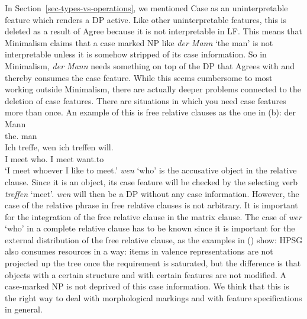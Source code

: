 \documentclass[output=paper,biblatex,babelshorthands,newtxmath,draftmode,colorlinks,citecolor=brown]{langscibook}
\begin{document}
In Section~\ref{sec-types-vs-operations}, we mentioned Case as an uninterpretable feature which
renders a DP active. Like other uninterpretable features, this is deleted as a result of Agree
because it is not interpretable in LF. 
This means that Minimalism claims
that a case marked NP like \emph{der Mann} `the man' is not interpretable unless it is somehow
stripped of its case information.
So in Minimalism, \emph{der Mann} needs something on top of the DP
that Agrees with and thereby consumes the case feature. While this seems cumbersome to most working outside Minimalism,
there are actually deeper problems connected to the deletion of case features. There are
situations in which you need case features more than once. An example of this is free relative
clauses as the one in (b):
\eal
\ex 
\gll der Mann\\
     the.\nom{} man\\
\ex
\gll Ich treffe, wen ich treffen will.\\
     I meet who.\acc{} I meet want.to\\
\glt `I meet whoever I like to meet.'
\zl
\emph{wen} `who' is the accusative object in the relative clause. Since it is an object, its case feature
will be checked by the selecting verb \emph{treffen} `meet'. \emph{wen} will then be a DP without
any case information. However, the case of the relative phrase in free relative clauses is not
arbitrary. It is important for the integration of the free relative clause in the matrix clause. The
case of \emph{wer} `who' in a complete relative clause has to be known since it is important for the
external distribution of the free relative clause, as the examples in () show:
\eal
{}
\zl
HPSG also consumes resources in a way: items in valence representations are not projected up the
tree once the requirement is saturated, but the difference is that objects with a certain structure
and with certain features are not modified. A case-marked NP is not deprived of this case
information. We think that this is the right way to deal with morphological
markings and with feature specifications in general.
\end{document}
